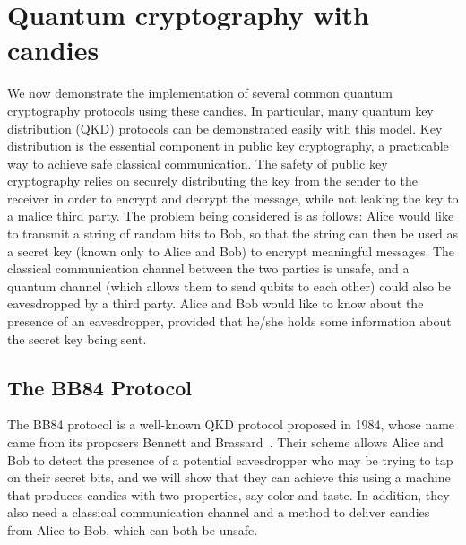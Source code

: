 \documentclass{article}
\begin{document}
\section{Quantum cryptography with candies}
We now demonstrate the implementation of several common quantum cryptography protocols using these candies.
In particular, many quantum key distribution (QKD) protocols can be demonstrated easily with this model.
Key distribution is the essential component in public key cryptography, a practicable way to achieve safe classical communication.
The safety of public key cryptography relies on securely distributing the key from the sender to the receiver in order to encrypt and decrypt the message, while not leaking the key to a malice third party.
The problem being considered is as follows: Alice would like to transmit a string of random bits to Bob, so that the string can then be used as a secret key (known only to Alice and Bob) to encrypt meaningful messages.
The classical communication channel between the two parties is unsafe, and a quantum channel (which allows them to send qubits to each other) could also be eavesdropped by a third party.
Alice and Bob would like to know about the presence of an eavesdropper, provided that he/she holds some information about the secret key being sent. 

\subsection{The BB84 Protocol}

The BB84 protocol is a well-known QKD protocol proposed in 1984, whose name came from its proposers Bennett and Brassard~\cite{bennett1984quantum}.
Their scheme allows Alice and Bob to detect the presence of a potential eavesdropper who may be trying to tap on their secret bits, and we will show that they can achieve this using a machine that produces candies with two properties, say color and taste.
In addition, they also need a classical communication channel and a method to deliver candies from Alice to Bob, which can both be unsafe.
\end{document}
